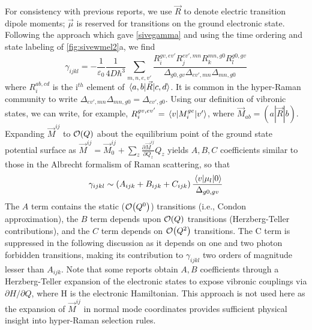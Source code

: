 \documentclass[aip, jcp, reprint, twocolumn]{revtex4-2}
\begin{document}
For consistency with previous reports, we use $\vec{R}$ to denote electric transition dipole moments; $\vec{\mu}$ is reserved for transitions on the ground electronic state. \cite{Tang1970}
Following the approach which gave \autoref{sivegamma} and using the time ordering and state labeling of \autoref{fig:sivewmel2}a, we find
\begin{equation}\label{drgamma_notaylor}
	\gamma_{ijkl} = -\frac{1}{\varepsilon_0} \frac{1}{4D \hbar^3} \sum_{m,n,e,v'} \frac{
		R_{i}^{gv, ev'} 
		R_{j}^{ev',mn} 
		R_{k}^{mn,g0} 
		R_{l}^{g0,gv} 
	}{\Delta_{g0,gv}
		\Delta_{ev', mn}
		\Delta_{mn, g0}
	}
\end{equation}
where $R_{i}^{ab,cd}$ is the i$^{th}$ element of $\mel{a,b}{\vec{R}}{c,d}$.
It is common in the hyper-Raman community to write $\Delta_{ev', mn} \Delta_{mn, g0} = \Delta_{ev', g0}$.
Using our definition of vibronic states, we can write, for example,
$R_{i}^{gv,ev'} = \mel{v}{M_i^{ge}}{v'}$, where $\vec{M}_{ab} = (a|\vec{R}|b)$.\cite{Ziegler1974}
Expanding $\vec{M}^{ij}$ to $\order{Q}$ about the equilibrium point of the ground state potential surface as
$\vec{M}^{ij} = \vec{M}^{ij}_0 + \sum_z \frac{\partial\vec{M}^{ij}}{\partial Q_z} Q_z$
yields $A, B, C$ coefficients similar to those in the Albrecht formalism of Raman scattering, \cite{Albrecht1961, Warshel1977, Ziegler1988} so that
\begin{equation}
		\gamma_{ijkl} \sim \left(A_{ijk} + B_{ijk} + C_{ijk}\right) \frac{\mel{v}{\mu_{l}}{0}} {\Delta_{g0,gv}}
\end{equation}
The $A$ term contains the static ($\order{Q^0}$) transitions (i.e., Condon approximation), the $B$ term depends upon $\order{Q}$ transitions (Herzberg-Teller contributions), and the $C$ term depends on $\order{Q^2}$ transitions. 
The C term is suppressed in the following discussion as it depends on one and two photon forbidden transitions, making its contribution to $\gamma_{ijkl}$ two orders of magnitude lesser than $A_{ijk}$. \cite{Ziegler1988, Neddersen1989, Bonang1992}
Note that some reports obtain $A, B$ coefficients through a Herzberg-Teller expansion of the electronic states to expose vibronic couplings via $\partial H / \partial Q$, where H is the electronic Hamiltonian.\cite{HerzbergTeller1933, Petrov1985, Neddersen1989, Baranov1990}
This approach is not used here as the expansion of $\vec{M}^{ij}$ in normal mode coordinates provides sufficient physical insight into hyper-Raman selection rules. 
\end{document}
